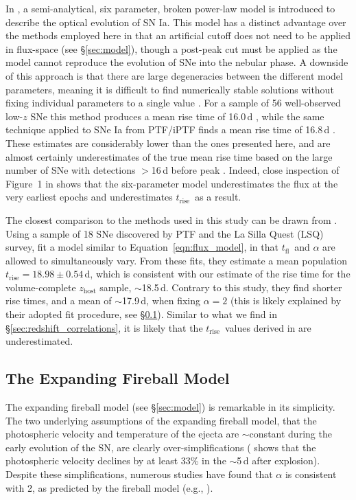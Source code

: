 \documentclass[twocolumn]{./aastex63}
\newcommand{\tfl}{$t_\mathrm{fl}$}
\newcommand{\trise}{$t_\mathrm{rise}$}
\begin{document}
In \citet{Zheng17}, a semi-analytical, six parameter, broken power-law model
is introduced to describe the optical evolution of SN Ia. This model has a
distinct advantage over the methods employed here in that an artificial cutoff
does not need to be applied in flux-space (see \S\ref{sec:model}), though a
post-peak cut must be applied as the model cannot reproduce the evolution of
SNe into the nebular phase. A downside of this approach is that there are
large degeneracies between the different model parameters, meaning it is
difficult to find numerically stable solutions without fixing individual
parameters to a single value \citep{Zheng17a}. For a sample of 56
well-observed low-$z$ SNe this method produces a mean rise time of 16.0\,d
\citep{Zheng17a}, while the same technique applied to SNe Ia from PTF/iPTF
finds a mean rise time of 16.8\,d \citep{Papadogiannakis19}. These estimates
are considerably lower than the ones presented here, and are almost certainly
underestimates of the true mean rise time based on the large number of SNe
with detections $>$16\,d before peak \citep{Papadogiannakis19, Yao19}. Indeed,
close inspection of Figure~1 in \citet{Zheng17a} shows that the six-parameter
model underestimates the flux at the very earliest epochs and underestimates
\trise\ as a result.

The closest comparison to the methods used in this study can be drawn from
\citet{Firth15}. Using a sample of 18 SNe discovered by PTF and the La Silla
Quest (LSQ) survey, \citeauthor{Firth15} fit a model similar to
Equation~\ref{eqn:flux_model}, in that \tfl\ and $\alpha$ are allowed to
simultaneously vary. From these fits, they estimate a mean population \trise$
= 18.98 \pm 0.54$\,d, which is consistent with our estimate of the rise time
for the volume-complete $z_\mathrm{host}$ sample, $\sim$18.5\,d. Contrary to
this study, they find shorter rise times, and a mean of $\sim$17.9\,d, when
fixing $\alpha = 2$ (this is likely explained by their adopted fit procedure,
see \S\ref{sec:fireball_discussion}). Similar to what we find in
\S\ref{sec:redshift_correlations}, it is likely that the \trise\ values
derived in \citet{Firth15} are underestimated.

\subsection{The Expanding Fireball Model}\label{sec:fireball_discussion}

The expanding fireball model (see \S\ref{sec:model}) is remarkable in its
simplicity. The two underlying assumptions of the expanding fireball model,
that the photospheric velocity and temperature of the ejecta are
$\sim$constant during the early evolution of the SN, are clearly
over-simplifications (\citealt{Parrent12} shows that the photospheric velocity
declines by at least 33\% in the $\sim$5\,d after explosion). Despite these simplifications, numerous studies have found that $\alpha$ is
consistent with 2, as predicted by the fireball model (e.g.,
\citealt{Conley06,Hayden10,Ganeshalingam11,Gonzalez-Gaitan12,Zheng17a}).
\end{document}
